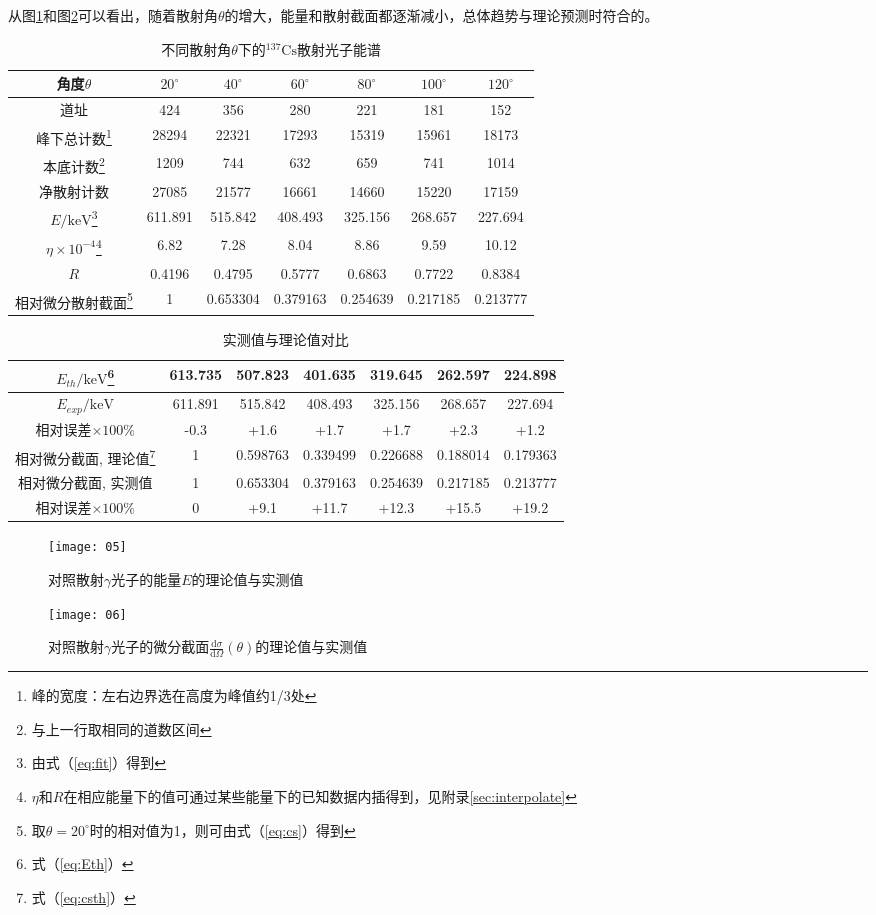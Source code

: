 \documentclass[aps,pre,12pt,preprint,onecolumn,showpacs,showkeys]{revtex4-1}
\def \d {\mathrm d}
\def \cs {\frac{\d \sigma}{\d \Omega}(\theta)}
\def \Cs {^{137}\mathrm{Cs}}
\def \degree {^\circ}
\begin{document}
从图\ref{fig:05}和图\ref{fig:06}可以看出，随着散射角$\theta$的增大，能量和散射截面都逐渐减小，总体趋势与理论预测时符合的。
\begin{table}[h]
\caption{\label{tab:stats}%
不同散射角$\theta$下的$\Cs$散射光子能谱}
\begin{tabular}{|c|c|c|c|c|c|c|}
\hline
角度$\theta$	&	$20\degree$	&	$40\degree$	&	$60\degree$	&	$80\degree$	&	$100\degree$	&	$120\degree$	\\\hline
道址	&	424	&	356	&	280	&	221	&	181	&	152	\\\hline
峰下总计数\footnote{峰的宽度：左右边界选在高度为峰值约1/3处}		&	28294	&	22321	&	17293	&	15319	&	15961	&	18173	\\\hline
本底计数\footnote{与上一行取相同的道数区间}	&	1209	&	744	&	632	&	659	&	741	&	1014	\\\hline
净散射计数	&	27085	&	21577	&	16661	&	14660	&	15220	&	17159	\\\hline
$E/\mathrm{keV}$\footnote{由式（\ref{eq:fit}）得到}		&	611.891	&	515.842	&	408.493	&	325.156	&	268.657	&	227.694	\\\hline
$\eta \times 10 ^{-4}$\footnote{$\eta$和$R$在相应能量下的值可通过某些能量下的已知数据内插得到，见附录\ref{sec:interpolate}}	&	6.82	&	7.28	&	8.04	&	8.86	&	9.59	&	10.12	\\\hline
$R$	&	0.4196	&	0.4795	&	0.5777	&	0.6863	&	0.7722	&	0.8384	\\\hline
相对微分散射截面\footnote{取$\theta=20\degree$时的相对值为1，则可由式（\ref{eq:cs}）得到}	&	1	&	0.653304	&	0.379163	&	0.254639	&	0.217185	&	0.213777	\\\hline
\end{tabular}
\end{table}
\begin{table}[h]
\caption{\label{tab:contrast}%
实测值与理论值对比}
\begin{tabular}{|c|c|c|c|c|c|c|}
\hline
$E_{th}/\mathrm{keV}$\footnote{式（\ref{eq:Eth}）}	&	613.735	&	507.823	&	401.635	&	319.645	&	262.597	&	224.898	\\\hline
$E_{exp}/\mathrm{keV}$		&	611.891	&	515.842	&	408.493	&	325.156	&	268.657	&	227.694	\\\hline
相对误差$\times 100 \%$	&	-0.3	&	+1.6	&	+1.7	&	+1.7	&	+2.3	&	+1.2	\\\hline
相对微分截面, 理论值\footnote{式（\ref{eq:csth}）}		&	1	&	0.598763	&	0.339499	&	0.226688	&0.188014	&	0.179363	\\\hline
相对微分截面, 实测值	&	1	&	0.653304	&	0.379163	&	0.254639	&	0.217185	&	0.213777	\\\hline
相对误差$\times 100 \%$	&	0	&	+9.1	&	+11.7	&	+12.3	&	+15.5	&	+19.2	\\\hline
\end{tabular}
\end{table}
\begin{figure}[h]
\centering
\texttt{[image: 05]}
\caption{\label{fig:05}%
对照散射$\gamma$光子的能量$E$的理论值与实测值}
\end{figure}
\begin{figure}[h]
\centering
\texttt{[image: 06]}
\caption{\label{fig:06}%
对照散射$\gamma$光子的微分截面$\cs$的理论值与实测值}
\end{figure}
\end{document}
